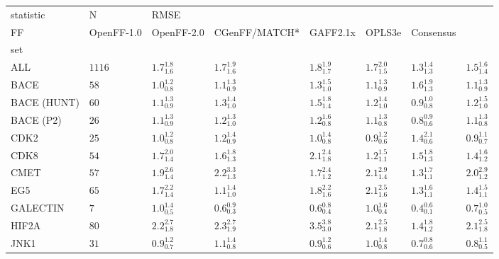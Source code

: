 \begin{tabular}{llllllll}
\toprule
statistic &       N & \multicolumn{6}{l}{RMSE} \\
FF &         OpenFF-1.0 &         OpenFF-2.0 &      CGenFF/MATCH* &           GAFF2.1x &             OPLS3e &          Consensus \\
set         &         &                    &                    &                    &                    &                    &                    \\
\midrule
ALL         &  $1116$ &  $1.7_{1.6}^{1.8}$ &  $1.7_{1.6}^{1.9}$ &  $1.8_{1.7}^{1.9}$ &  $1.7_{1.5}^{2.0}$ &  $1.3_{1.3}^{1.4}$ &  $1.5_{1.4}^{1.6}$ \\
BACE        &    $58$ &  $1.0_{0.8}^{1.2}$ &  $1.1_{0.9}^{1.3}$ &  $1.3_{1.0}^{1.5}$ &  $1.1_{0.9}^{1.3}$ &  $1.6_{1.3}^{1.9}$ &  $1.1_{0.9}^{1.3}$ \\
BACE (HUNT) &    $60$ &  $1.1_{0.9}^{1.3}$ &  $1.3_{1.0}^{1.4}$ &  $1.5_{1.4}^{1.8}$ &  $1.2_{1.0}^{1.4}$ &  $0.9_{0.8}^{1.0}$ &  $1.2_{1.0}^{1.5}$ \\
BACE (P2)   &    $26$ &  $1.1_{0.9}^{1.3}$ &  $1.2_{1.0}^{1.3}$ &  $1.2_{0.8}^{1.6}$ &  $1.1_{0.8}^{1.3}$ &  $0.8_{0.6}^{0.9}$ &  $1.1_{0.8}^{1.3}$ \\
CDK2        &    $25$ &  $1.0_{0.8}^{1.2}$ &  $1.2_{0.9}^{1.4}$ &  $1.0_{0.8}^{1.4}$ &  $0.9_{0.6}^{1.2}$ &  $1.4_{0.6}^{2.1}$ &  $0.9_{0.7}^{1.1}$ \\
CDK8        &    $54$ &  $1.7_{1.4}^{2.0}$ &  $1.6_{1.3}^{1.8}$ &  $2.1_{1.8}^{2.4}$ &  $1.2_{1.1}^{1.5}$ &  $1.5_{1.3}^{1.8}$ &  $1.4_{1.2}^{1.6}$ \\
CMET        &    $57$ &  $1.9_{1.4}^{2.6}$ &  $2.2_{1.3}^{3.3}$ &  $1.7_{1.2}^{2.4}$ &  $2.1_{1.4}^{2.9}$ &  $1.3_{1.1}^{1.7}$ &  $2.0_{1.2}^{2.9}$ \\
EG5         &    $65$ &  $1.7_{1.4}^{2.2}$ &  $1.1_{1.0}^{1.4}$ &  $1.8_{1.6}^{2.2}$ &  $2.1_{1.6}^{2.5}$ &  $1.3_{1.1}^{1.6}$ &  $1.4_{1.1}^{1.5}$ \\
GALECTIN    &     $7$ &  $1.0_{0.5}^{1.4}$ &  $0.6_{0.3}^{0.9}$ &  $0.6_{0.4}^{0.8}$ &  $1.0_{0.4}^{1.6}$ &  $0.4_{0.1}^{0.6}$ &  $0.7_{0.5}^{1.0}$ \\
HIF2A       &    $80$ &  $2.2_{1.8}^{2.7}$ &  $2.3_{1.9}^{2.7}$ &  $3.5_{3.0}^{3.8}$ &  $2.1_{1.8}^{2.5}$ &  $1.4_{1.2}^{1.8}$ &  $2.1_{1.8}^{2.5}$ \\
JNK1        &    $31$ &  $0.9_{0.7}^{1.2}$ &  $1.1_{0.8}^{1.4}$ &  $0.9_{0.6}^{1.2}$ &  $1.0_{0.8}^{1.4}$ &  $0.7_{0.6}^{0.8}$ &  $0.8_{0.5}^{1.1}$ \\

\end{tabular}
